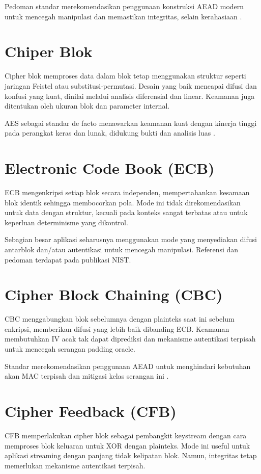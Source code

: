 \documentclass[../main.tex]{subfiles}
\begin{document}
Pedoman standar merekomendasikan penggunaan konstruksi AEAD modern untuk mencegah manipulasi dan memastikan integritas, selain kerahasiaan \parencite{rfc5116}.

\section{Chiper Blok}
Cipher blok memproses data dalam blok tetap menggunakan struktur seperti jaringan Feistel atau substitusi-permutasi. Desain yang baik mencapai difusi dan konfusi yang kuat, dinilai melalui analisis diferensial dan linear. Keamanan juga ditentukan oleh ukuran blok dan parameter internal.

AES sebagai standar de facto menawarkan keamanan kuat dengan kinerja tinggi pada perangkat keras dan lunak, didukung bukti dan analisis luas \parencite{fips197}.

\section{Electronic Code Book (ECB)}
ECB mengenkripsi setiap blok secara independen, mempertahankan kesamaan blok identik sehingga membocorkan pola. Mode ini tidak direkomendasikan untuk data dengan struktur, kecuali pada konteks sangat terbatas atau untuk keperluan determinisme yang dikontrol.

Sebagian besar aplikasi seharusnya menggunakan mode yang menyediakan difusi antarblok dan/atau autentikasi untuk mencegah manipulasi. Referensi dan pedoman terdapat pada publikasi NIST.

\section{Cipher Block Chaining (CBC)}
CBC menggabungkan blok sebelumnya dengan plainteks saat ini sebelum enkripsi, memberikan difusi yang lebih baik dibanding ECB. Keamanan membutuhkan IV acak tak dapat diprediksi dan mekanisme autentikasi terpisah untuk mencegah serangan padding oracle.

Standar merekomendasikan penggunaan AEAD untuk menghindari kebutuhan akan MAC terpisah dan mitigasi kelas serangan ini \parencite{nist80038d}.

\section{Cipher Feedback (CFB)}
CFB memperlakukan cipher blok sebagai pembangkit keystream dengan cara memproses blok keluaran untuk XOR dengan plainteks. Mode ini useful untuk aplikasi streaming dengan panjang tidak kelipatan blok. Namun, integritas tetap memerlukan mekanisme autentikasi terpisah.
\end{document}
